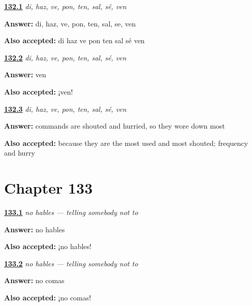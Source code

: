 \noindent\begin{minipage}[t]{\linewidth}
\raggedright
\hyperlink{review-ES-C50-ocho-cortos-list}{\textbf{132.1}} \emph{di, haz, ve, pon, ten, sal, sé, ven}\par
\small \textbf{Answer:} di, haz, ve, pon, ten, sal, se, ven\par
\footnotesize \textbf{Also accepted:} di haz ve pon ten sal sé ven
\end{minipage}\par\medskip

\noindent\begin{minipage}[t]{\linewidth}
\raggedright
\hyperlink{review-ES-C50-ocho-cortos-come}{\textbf{132.2}} \emph{di, haz, ve, pon, ten, sal, sé, ven}\par
\small \textbf{Answer:} ven\par
\footnotesize \textbf{Also accepted:} ¡ven!
\end{minipage}\par\medskip

\noindent\begin{minipage}[t]{\linewidth}
\raggedright
\hyperlink{review-ES-C50-ocho-cortos-why}{\textbf{132.3}} \emph{di, haz, ve, pon, ten, sal, sé, ven}\par
\small \textbf{Answer:} commands are shouted and hurried, so they wore down most\par
\footnotesize \textbf{Also accepted:} because they are the most used and most shouted; frequency and hurry
\end{minipage}\par\medskip

\section*{Chapter 133}

\noindent\begin{minipage}[t]{\linewidth}
\raggedright
\hyperlink{review-ES-C50-no-hables-say}{\textbf{133.1}} \emph{no hables — telling somebody not to}\par
\small \textbf{Answer:} no hables\par
\footnotesize \textbf{Also accepted:} ¡no hables!
\end{minipage}\par\medskip

\noindent\begin{minipage}[t]{\linewidth}
\raggedright
\hyperlink{review-ES-C50-no-hables-eat}{\textbf{133.2}} \emph{no hables — telling somebody not to}\par
\small \textbf{Answer:} no comas\par
\footnotesize \textbf{Also accepted:} ¡no comas!
\end{minipage}\par\medskip

